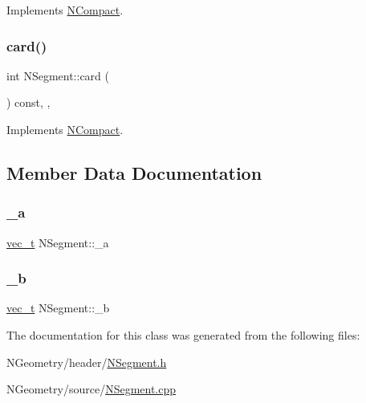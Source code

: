 Implements \mbox{\hyperlink{class_n_compact_a574764d7ac4fe2393a739b67bf57a7f1}{N\+Compact}}.

\mbox{\label{class_n_segment_a2fbe9d64e08f8aaa60d09ba8fe0ca2ba}} 
\subsubsection{\texorpdfstring{card()}{card()}}
{\footnotesize\ttfamily int N\+Segment\+::card (\begin{DoxyParamCaption}{ }\end{DoxyParamCaption}) const\hspace{0.3cm}{\ttfamily [override]}, {\ttfamily [protected]}, {\ttfamily [virtual]}}



Implements \mbox{\hyperlink{class_n_compact_a816bb4976567a7bfed57763ce717b685}{N\+Compact}}.



\subsection{Member Data Documentation}
\mbox{\label{class_n_segment_ae97f9d86f36042b6d90f202c266c5fa2}} 
\subsubsection{\texorpdfstring{\_a}{\_a}}
{\footnotesize\ttfamily \mbox{\hyperlink{group___n_algebra_ga0a2cfc67e738a3d73e4f12098c4c07f6}{vec\+\_\+t}} N\+Segment\+::\+\_\+a\hspace{0.3cm}{\ttfamily [protected]}}

\mbox{\label{class_n_segment_a46d4842dffd0446c07a92704dd527096}} 
\subsubsection{\texorpdfstring{\_b}{\_b}}
{\footnotesize\ttfamily \mbox{\hyperlink{group___n_algebra_ga0a2cfc67e738a3d73e4f12098c4c07f6}{vec\+\_\+t}} N\+Segment\+::\+\_\+b\hspace{0.3cm}{\ttfamily [protected]}}



The documentation for this class was generated from the following files\+:\begin{DoxyCompactItemize}
\item 
N\+Geometry/header/\mbox{\hyperlink{_n_segment_8h}{N\+Segment.\+h}}\item 
N\+Geometry/source/\mbox{\hyperlink{_n_segment_8cpp}{N\+Segment.\+cpp}}\end{DoxyCompactItemize}
